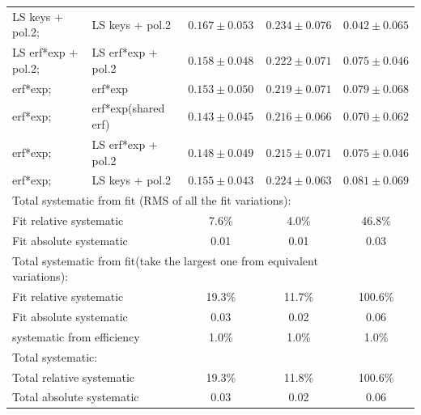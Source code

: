 \begin{table}[!h]
\begin{tabular}{ll|c|c|c}
\hline
LS keys + pol.2;        & LS keys + pol.2    & $0.167\pm0.053$ & $0.234\pm0.076$  &  $0.042\pm 0.065$ \\
LS erf*exp + pol.2;     & LS erf*exp + pol.2 & $0.158\pm0.048$ & $0.222\pm0.071$  &  $0.075\pm 0.046$ \\
\hline
erf*exp;                & erf*exp            & $0.153\pm0.050$ & $0.219\pm0.071$  &  $0.079\pm 0.068$ \\
erf*exp;                & erf*exp(shared erf)& $0.143\pm0.045$ & $0.216\pm0.066$  &  $0.070\pm 0.062$ \\
erf*exp;                & LS erf*exp + pol.2 & $0.148\pm0.049$ & $0.215\pm0.071$  &  $0.075\pm 0.046$ \\
erf*exp;                & LS keys + pol.2    & $0.155\pm0.043$ & $0.224\pm0.063$  &  $0.081\pm 0.069$ \\
\hline \hline
\multicolumn{4}{l}{Total systematic from fit (RMS of all the fit variations):} \\
\multicolumn{2}{l|}{Fit relative systematic} & 7.6\%  & 4.0\%  & 46.8\% \\  %
\multicolumn{2}{l|}{Fit absolute systematic} & 0.01 & 0.01 & 0.03\\    %
\hline
\multicolumn{4}{l}{Total systematic from fit(take the largest one from equivalent variations):} \\
\multicolumn{2}{l|}{Fit relative systematic} & 19.3\%  & 11.7\%  & 100.6\%\\
\multicolumn{2}{l|}{Fit absolute systematic} & 0.03 & 0.02 & 0.06 \\
\hline
\hline
\multicolumn{2}{l|}{systematic from efficiency} & 1.0\% & 1.0\% & 1.0\%\\
\hline \hline
\multicolumn{4}{l}{Total systematic: } \\
\multicolumn{2}{l|}{Total relative systematic} & 19.3\%  & 11.8\%  &100.6\% \\
\multicolumn{2}{l|}{Total absolute systematic} & 0.03 & 0.02 & 0.06\\

\end{tabular}
\end{table}
